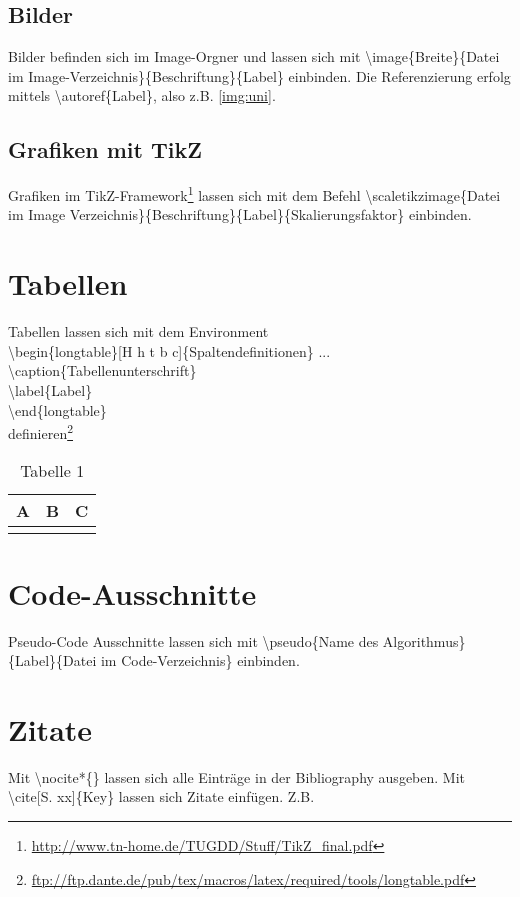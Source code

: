 \subsection{Bilder}\label{subsec:bilder}
Bilder befinden sich im Image-Orgner und lassen sich mit \textbackslash image\{Breite\}\{Datei im Image-Verzeichnis\}\{Beschriftung\}\{Label\} einbinden.  Die Referenzierung erfolg mittels \textbackslash autoref\{Label\}, also z.B. \autoref{img:uni}.
\subsection{Grafiken mit TikZ}
Grafiken im TikZ-Framework\footnote{\url{http://www.tn-home.de/TUGDD/Stuff/TikZ_final.pdf}} lassen sich mit dem Befehl \textbackslash scaletikzimage\{Datei im Image Verzeichnis\}\{Beschriftung\}\{Label\}\{Skalierungsfaktor\} einbinden. 
\section{Tabellen}
Tabellen lassen sich mit dem Environment\\
\textbackslash begin\{longtable\}[H h t b c]\{Spaltendefinitionen\} ...\\
\qquad\qquad \textbackslash caption\{Tabellenunterschrift\}\\
\qquad\qquad \textbackslash label\{Label\}\\
\textbackslash end\{longtable\}\\
 definieren\footnote{\url{ftp://ftp.dante.de/pub/tex/macros/latex/required/tools/longtable.pdf}}\\
\begin{longtable}[H]{|p{}|p{}|p{}|}
\hline
A&B&C\\
\hline
\caption{Tabelle 1}
\label{tab:tab1}
\end{longtable}
\section{Code-Ausschnitte}
Pseudo-Code Ausschnitte lassen sich mit \textbackslash pseudo\{Name des Algorithmus\}\{Label\}\{Datei im Code-Verzeichnis\} einbinden.
\section{Zitate}
Mit \textbackslash nocite*\{\} lassen sich alle Einträge in der Bibliography ausgeben. Mit \textbackslash cite[S. xx]\{Key\} lassen sich Zitate einfügen. Z.B. \cite[S. 234]{Ferstl.2008} \nocite*{}
